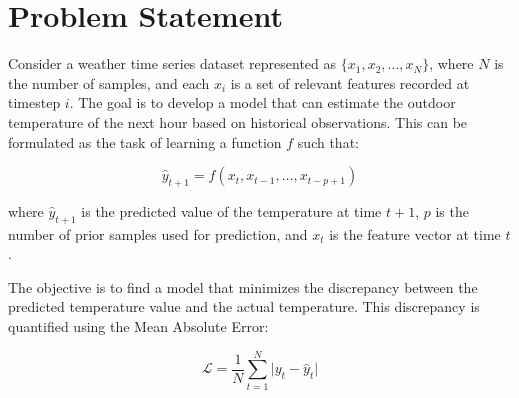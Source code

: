 \section{Problem Statement}

Consider a weather time series dataset represented as $\{x_1, x_2, \ldots, x_N\}$, where $N$ is the number of samples, and each $x_i$ is a set of relevant features recorded at timestep $i$. The goal is to develop a model that can estimate the outdoor temperature of the next hour based on historical observations. This can be formulated as the task of learning a function $f$ such that:

\begin{equation}
    \hat{y}_{t+1} = f(x_t, x_{t-1}, \ldots, x_{t-p+1})
\end{equation}

where $\hat{y}_{t+1}$ is the predicted value of the temperature at time $t+1$, $p$ is the number of prior samples used for prediction, and $x_t$ is the feature vector at time $t$.

The objective is to find a model that minimizes the discrepancy between the predicted temperature value and the actual temperature. This discrepancy is quantified using the Mean Absolute Error:

\begin{equation}
\mathcal{L} = \frac{1}{N} \sum_{t=1}^{N} \vert y_t - \hat {y}_t \vert
\end{equation}

